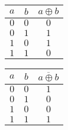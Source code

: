 \begin{row}{12}{2}
	\begin{cell}{6}
		\centering
		\begin{tabular}{cc|c}
			\toprule
			$a$ & $b$ & $a \oplus b$ \\
			\midrule
			$0$ & $0$ & $0$          \\
			$0$ & $1$ & $1$          \\
			$1$ & $0$ & $1$          \\
			$1$ & $1$ & $0$          \\
			\bottomrule
		\end{tabular}
		\vspace{1ex}
	\end{cell}
	\begin{cell}{6}
		\centering
		\begin{tabular}{cc|c}
			\toprule
			$a$ & $b$ & $\overline{a \oplus b}$ \\
			\midrule
			$0$ & $0$ & $1$                     \\
			$0$ & $1$ & $0$                     \\
			$1$ & $0$ & $0$                     \\
			$1$ & $1$ & $1$                     \\
			\bottomrule
		\end{tabular}
		\vspace{1ex}
	\end{cell}
\end{row}
